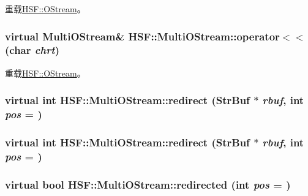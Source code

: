 重载\hyperlink{classHSF_1_1OStream_a1e3204a3bf16caf916d3e18c562a709c}{HSF::OStream}。\hypertarget{classHSF_1_1MultiOStream_a5539fcb94f7ab127f5d41768f18c59d0}{
\subsubsection[{operator$<$$<$}]{\setlength{\rightskip}{0pt plus 5cm}virtual {\bf MultiOStream}\& HSF::MultiOStream::operator$<$$<$ (char {\em chrt})}}
\label{classHSF_1_1MultiOStream_a5539fcb94f7ab127f5d41768f18c59d0}


重载\hyperlink{classHSF_1_1OStream_ad542e8e0a3da490c9df517819fe174ca}{HSF::OStream}。\hypertarget{classHSF_1_1MultiOStream_a5b4339f2eafeae22419e413625b94216}{
\subsubsection[{redirect}]{\setlength{\rightskip}{0pt plus 5cm}virtual int HSF::MultiOStream::redirect ({\bf StrBuf} $\ast$ {\em rbuf}, \/  int {\em pos} = {})}}
\label{classHSF_1_1MultiOStream_a5b4339f2eafeae22419e413625b94216}
\hypertarget{classHSF_1_1MultiOStream_a5b4339f2eafeae22419e413625b94216}{
\subsubsection[{redirect}]{\setlength{\rightskip}{0pt plus 5cm}virtual int HSF::MultiOStream::redirect ({\bf StrBuf} $\ast$ {\em rbuf}, \/  int {\em pos} = {})}}
\label{classHSF_1_1MultiOStream_a5b4339f2eafeae22419e413625b94216}
\hypertarget{classHSF_1_1MultiOStream_a4f08ea78abbcd60f0d6460cdce6ea79d}{
\subsubsection[{redirected}]{\setlength{\rightskip}{0pt plus 5cm}virtual bool HSF::MultiOStream::redirected (int {\em pos} = {})}}
